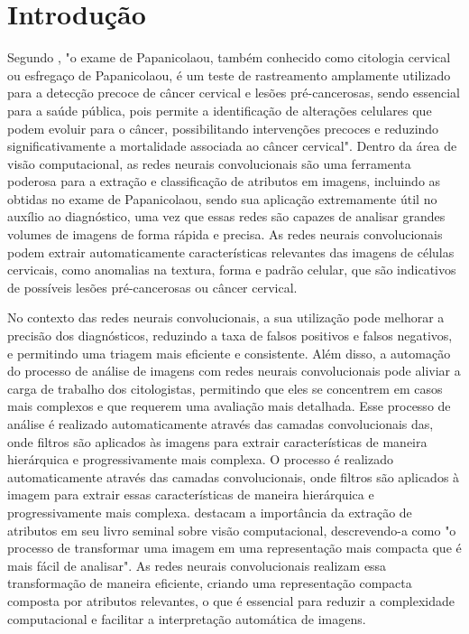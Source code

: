 \chapter{Introdução}\label{chapter:introducao}

Segundo \cite{solomon}, "o exame de Papanicolaou, também conhecido como citologia cervical ou esfregaço de Papanicolaou, é um teste de rastreamento amplamente utilizado para a detecção precoce de câncer cervical e lesões pré-cancerosas, sendo essencial para a saúde pública, pois permite a identificação de alterações celulares que podem evoluir para o câncer, possibilitando intervenções precoces e reduzindo significativamente a mortalidade associada ao câncer cervical". Dentro da área de visão computacional, as redes neurais convolucionais são uma ferramenta poderosa para a extração e classificação de atributos em imagens, incluindo as obtidas no exame de Papanicolaou, sendo sua aplicação extremamente útil no auxílio ao diagnóstico, uma vez que essas redes são capazes de analisar grandes volumes de imagens de forma rápida e precisa. As redes neurais convolucionais podem extrair automaticamente características relevantes das imagens de células cervicais, como anomalias na textura, forma e padrão celular, que são indicativos de possíveis lesões pré-cancerosas ou câncer cervical.

No contexto das redes neurais convolucionais, a sua utilização pode melhorar a precisão dos diagnósticos, reduzindo a taxa de falsos positivos e falsos negativos, e permitindo uma triagem mais eficiente e consistente. Além disso, a automação do processo de análise de imagens com redes neurais convolucionais pode aliviar a carga de trabalho dos citologistas, permitindo que eles se concentrem em casos mais complexos e que requerem uma avaliação mais detalhada. Esse processo de análise é realizado automaticamente através das camadas convolucionais das, onde filtros são aplicados às imagens para extrair características de maneira hierárquica e progressivamente mais complexa. O processo é realizado automaticamente através das camadas convolucionais, onde filtros são aplicados à imagem para extrair essas características de maneira hierárquica e progressivamente mais complexa. \cite{forsyth} destacam a importância da extração de atributos em seu livro seminal sobre visão computacional, descrevendo-a como "o processo de transformar uma imagem em uma representação mais compacta que é mais fácil de analisar". As redes neurais convolucionais realizam essa transformação de maneira eficiente, criando uma representação compacta composta por atributos relevantes, o que é essencial para reduzir a complexidade computacional e facilitar a interpretação automática de imagens.

